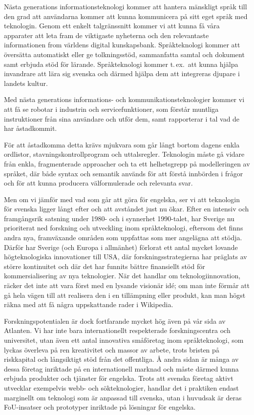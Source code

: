 \begin{multicols}{2}
Nästa generations informationsteknologi kommer att hantera mänskligt
språk till den grad att användarna kommer att kunna kommunicera på
sitt eget språk med teknologin. Genom ett enkelt talgränssnitt kommer
vi att kunna få våra apparater att \mbox{leta} fram de viktigaste nyheterna
och den relevant\-aste informationen from världens digital
kunskapsbank. Språkteknologi kommer att översätta auto\-mat\-iskt \mbox{eller} ge
tolkningsstöd, sammanfatta samtal och doku\-ment samt erbjuda stöd för
lärande. Språkteknologi kommer t.\,ex.~att kunna hjälpa invandrare att
lära sig svenska och därmed hjälpa dem att integrer\-as djupare i
landets kultur.

Med nästa generations informations- och kom\-muni\-ka\-tions\-teknologier
kommer vi att få se robotar i indust\-rin och service\-funktioner, som
förstår munt\-liga instruktioner från sina användare och utför dem, samt
rapporterar i tal vad de har åstadkommit.

För att åstadkomma detta krävs mjukvara som går långt bortom dagens
enkla ordlistor, stavnings\-kontroll\-program och uttalsregler. Teknologin
måste gå vidare från enkla, fragmenterade approacher och ta ett
helhetsgrepp på modelleringen av språket, där både syntax och semantik
används för att förstå innbörden i frågor och för att kunna producera
väl\-formu\-lerade och relevanta svar.

Men om vi jämför med vad som går att göra för engelska, ser vi att
teknologin för svenska ligger långt efter och att avståndet just nu
ökar. Efter en \mbox{intensiv} och framgångsrik satsning under 1980- och i
synnerhet 1990-talet, har Sverige nu prioriterat ned forskning och
utveckling inom språkteknologi, efter\-som det finns andra nya,
framväxande områden som uppfattas som mer angelägna att stödja.
Därför har Sverige (och Europa i allmänhet) förlorat ett antal mycket
lovande högteknologiska innovationer till USA, där
forskningsstrategierna har präglats av större kontinuitet och där det
har funnits bättre finansiellt stöd för kommersialisering av nya
teknologier. När det handlar om teknologiinnovation, räcker det inte
att vara först med en lysande visionär idé; om man inte förmår att gå
hela vägen till att realisera den i en tillämpning eller produkt, kan
man högst räkna med att få några uppskattande rader i Wikipedia.

Forskningspotentialen är dock fortfarande mycket hög även på vår sida
av Atlanten. Vi har inte \mbox{bara} inter\-nation\-ellt respekterade
forskningscentra och universitet, utan även ett antal innovativa
små\-före\-tag inom språkteknologi, som lyckas överleva på ren kreativitet
och massor av arbete, trots bristen på riskkapital och långsiktigt
stöd från det offent\-liga. Å andra sidan är många av dessa företag
inriktade på en internationell marknad och måste därmed kunna erbjuda
produkter och tjänster för engelska. Trots att svenska företag aktivt
utvecklar exempelvis webb- och sökteknologier, handlar det i prak\-tik\-en
endast marginellt om teknologi som är anpassad till \mbox{svenska}, utan i
huvudsak är deras FoU-insatser och prototyper inriktade på lösningar
för engelska.


\end{multicols}
